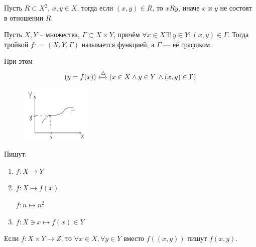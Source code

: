     \begin{example}
        Пусть $ R \subset X^2 $, $ x,y \in X $, тогда если $ (x, y) \in R $,
        то $ xRy $, иначе $ x $ и $ y $ не состоят в отношении $ R $. 
    \end{example}
    \begin{definition}
        Пусть $ X, Y $ -- множества, $ \Gamma\subset X  \times  Y$, причём $ \forall x \in X \exists 
        !\ y \in  Y: (x, y) \in \Gamma $. Тогда тройкой $ f : = \left(X, Y, \Gamma\right) $ называется
        функцией, а $ \Gamma $ --- её графиком.
    \end{definition}
    \begin{note}
        При этом \begin{equation}
            (y = f(x)) \xleftrightarrow{\triangle}\left(x \in X \land y \in Y\, \land 
            (x, y) \in \Gamma\right)
        \end{equation}
    
    \begin{figure}
        \centering
        \includegraphics[width = 0.3\textwidth]{../images/image1.png}
    \end{figure}
    
        Пишут: \begin{enumerate}
            \item $ f:  X \to  Y $
            \item $ f: X\mapsto f(x) $ \begin{example}
                $ f: n \mapsto n^2 $
            \end{example}
            \item $ f: X \ni x \mapsto f(x) \in Y $
        \end{enumerate}
    
        Если $ f: X \times Y \to Z $, то $ \forall x \in  X, \forall y \in  
        Y $ вместо $ f((x, y)) $ пишут $ f(x, y) $.
    \end{note}
   